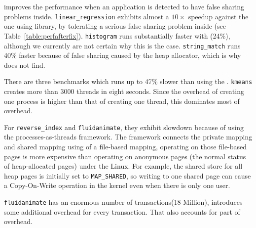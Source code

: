 \SheriffProtect{} improves the performance when an application is detected to have false sharing problems inside.  \texttt{linear\_regression} exhibits almost a $10\times$ speedup against the one using \pthreads{} library, by tolerating a serious false sharing problem inside (see Table~\ref{table:perfafterfix}). \texttt{histogram} runs substantially faster with \SheriffProtect{} (24\%), although we currently are not certain why this is the case. \texttt{string\_match} runs 40\% faster because of false sharing caused by the \pthreads{} heap allocator, which is why \SheriffDetect{} does not find. 

There are three benchmarks which runs up to 47\% slower than using the \pthreads{}. 
\texttt{kmeans} creates more than 3000 threads in eight seconds. Since the overhead of creating one process is higher than that of creating one thread, this dominates most of overhead. 

For \texttt{reverse\_index} and \texttt{fluidanimate}, 
they exhibit slowdown because of using the processes-as-threads framework. The \Sheriff{} framework connects the private mapping and shared mapping using of a file-based mapping, operating on those file-based pages is more expensive than operating on anonymous pages (the normal status of heap-allocated pages) under the Linux. For example, the shared store for all heap pages is initially set to \texttt{MAP\_SHARED}, so writing to one shared page can cause a Copy-On-Write operation in the kernel even when there is only one user. 

\texttt{fluidanimate} has an enormous number of transactions(18 Million), \sheriffprotect{} 
introduces some additional overhead for every transaction. That also accounts for part of overhead.
